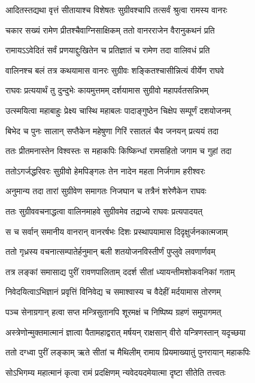 \twolineshloka
{आदितस्तद्यथा वृत्तं सीतायाश्च विशेषतः}
{सुग्रीवश्चापि तत्सर्वं श्रुत्वा रामस्य वानरः}%

\twolineshloka
{चकार सख्यं रामेण प्रीतश्चैवाग्निसाक्षिकम्}
{ततो वानरराजेन वैरानुकथनं प्रति}%

\twolineshloka
{रामायऽऽवेदितं सर्वं प्रणयाद्दुःखितेन च}
{प्रतिज्ञातं च रामेण तदा वालिवधं प्रति}%

\twolineshloka
{वालिनश्च बलं तत्र कथयामास वानरः}
{सुग्रीवः शङ्कितश्चासीन्नित्यं वीर्येण राघवे}%

\twolineshloka
{राघवः प्रत्ययार्थं तु दुन्दुभेः कायमुत्तमम्}
{दर्शयामास सुग्रीवो महापर्वतसन्निभम्}%

\twolineshloka
{उत्स्मयित्वा महाबाहुः प्रेक्ष्य चास्थि महाबलः}
{पादाङ्गुष्ठेन चिक्षेप सम्पूर्णं दशयोजनम्}%

\twolineshloka
{बिभेद च पुनः सालान् सप्तैकेन महेषुणा}
{गिरिं रसातलं चैव जनयन् प्रत्ययं तदा}%

\twolineshloka
{ततः प्रीतमनास्तेन विश्वस्तः स महाकपिः}
{किष्किन्धां रामसहितो जगाम च गुहां तदा}%

\twolineshloka
{ततोऽगर्जद्धरिवरः सुग्रीवो हेमपिङ्गलः}
{तेन नादेन महता निर्जगाम हरीश्वरः}%

\twolineshloka
{अनुमान्य तदा तारां सुग्रीवेण समागतः}
{निजघान च तत्रैनं शरेणैकेन राघवः}%

\twolineshloka
{ततः सुग्रीववचनाद्धत्वा वालिनमाहवे}
{सुग्रीवमेव तद्राज्ये राघवः प्रत्यपादयत्}%

\twolineshloka
{स च सर्वान् समानीय वानरान् वानरर्षभः}
{दिशः प्रस्थापयामास दिदृक्षुर्जनकात्मजाम्}%

\twolineshloka
{ततो गृध्रस्य वचनात्सम्पातेर्हनुमान् बली}
{शतयोजनविस्तीर्णं पुप्लुवे लवणार्णवम्}%

\twolineshloka
{तत्र लङ्कां समासाद्य पुरीं रावणपालिताम्}
{ददर्श सीतां ध्यायन्तीमशोकवनिकां गताम्}%

\twolineshloka
{निवेदयित्वाऽभिज्ञानं प्रवृत्तिं विनिवेद्य च}
{समाश्वास्य च वैदेहीं मर्दयामास तोरणम्}%

\twolineshloka
{पञ्च सेनाग्रगान् हत्वा सप्त मन्त्रिसुतानपि}
{शूरमक्षं च निष्पिष्य ग्रहणं समुपागमत्}%

\twolineshloka
{अस्त्रेणोन्मुक्तमात्मानं ज्ञात्वा पैतामहाद्वरात्}
{मर्षयन् राक्षसान् वीरो यन्त्रिणस्तान् यदृच्छया}%

\twolineshloka
{ततो दग्ध्वा पुरीं लङ्काम् ऋते सीतां च मैथिलीम्}
{रामाय प्रियमाख्यातुं पुनरायान् महाकपिः}%

\twolineshloka
{सोऽभिगम्य महात्मानं कृत्वा रामं प्रदक्षिणम्}
{न्यवेदयदमेयात्मा दृष्टा सीतेति तत्त्वतः}%

